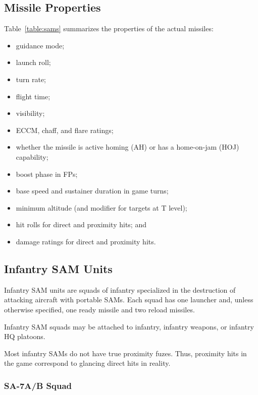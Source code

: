 \documentclass[10pt]{article}
\begin{document}
\subsection{Missile Properties}

Table~\ref{table:sams} summarizes the properties of the actual missiles:
\begin{itemize}
    \item guidance mode;
    \item launch roll;
    \item turn rate;
    \item flight time;
    \item visibility;
    \item ECCM, chaff, and flare ratings;
    \item whether the missile is active homing (AH) or has a home-on-jam (HOJ) capability;
    \item boost phase in FPs;
    \item base speed and sustainer duration in game turns;
    \item minimum altitude (and modifier for targets at T level);
    \item hit rolls for direct and proximity hits; and
    \item damage ratings for direct and proximity hits.
\end{itemize}


\subsection{Infantry SAM Units}

Infantry SAM units are squads of infantry specialized in the destruction of attacking aircraft with portable SAMs.
Each squad has one launcher and, unless otherwise specified, one ready missile and two reload missiles.

Infantry SAM squads may be attached to infantry, infantry weapons, or infantry HQ platoons.

Most infantry SAMs do not have true proximity fuzes. Thus, proximity hits in the game correspond to glancing direct hits in reality.

\subsubsection{SA-7A/B Squad}
\end{document}
